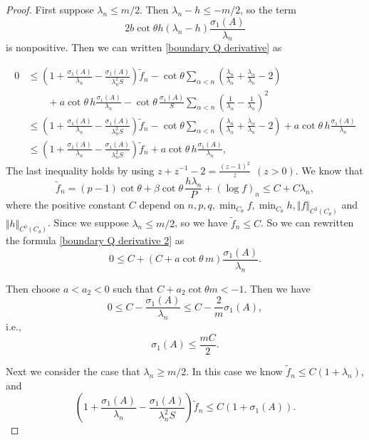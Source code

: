 \documentclass[10pt,a4paper]{amsart}
\begin{document}
\begin{proof}
First suppose $\lambda_n\leq m/2$. Then $\lambda_n-h\leq -m/2$, so the
 term
 $$2b\cot\theta h(\lambda_n -h)\frac{\sigma_1(A)}{\lambda_n}$$
 is nonpositive. Then we can written \eqref{boundary Q derivative} as

 \begin{equation}\label{boundary Q derivative 2}
\begin{split}
        0&\leq \left(1+\frac{\sigma_1(A)}{\lambda_n}
        -\frac{\sigma_1(A)}{\lambda_n^2S}\right)\tilde f_n
        -\cot\theta
        \sum_{\alpha<n}\left(\frac{\lambda_n}{\lambda_{\alpha}}
        +\frac{\lambda_{\alpha}}{\lambda_n}-2\right)\\
        &\qquad
       +a\cot\theta\,h\frac{\sigma_1(A)}{\lambda_n} -\cot\theta\,\frac{\sigma_1(A)}{S}
        \sum_{\alpha<n}\left(\frac1{\lambda_{\alpha}}
        -\frac1{\lambda_n}\right)^2  \\ 
        & 
        \leq \left(1+\frac{\sigma_1(A)}{\lambda_n}
        -\frac{\sigma_1(A)}{\lambda_n^2S}\right)\tilde f_n
        -\cot\theta
        \sum_{\alpha<n}\left(\frac{\lambda_n}{\lambda_{\alpha}}
        +\frac{\lambda_{\alpha}}{\lambda_n}-2\right) +a\cot\theta\,h\frac{\sigma_1(A)}{\lambda_n}\\ 
        &\leq 
        \left(1+\frac{\sigma_1(A)}{\lambda_n}
        -\frac{\sigma_1(A)}{\lambda_n^2S}\right)\tilde f_n +a\cot\theta\,h\frac{\sigma_1(A)}{\lambda_n},
\end{split}
\end{equation}
 The last inequality holds by using $z+z^{-1}-2 = \frac{(z-1)^2}{z} ~~(z>0)$.
We know that 
$$ \tilde f_n
        =(p-1)\cot\theta
        +\beta\cot\theta\,
        \frac{h\lambda_n}{P}
        +(\log f)_n \leq C+C\lambda_n,
        $$
where the positive constant $C$ depend on $n, p, q, \min_{C_{\theta}}f, \min_{C_{\theta}}h, \Vert f\Vert_{C^2 (C_{\theta})}$ and $\Vert h\Vert _{C^0 (C_{\theta})}$. Since we suppose $\lambda_n \leq m/2$, so we have $\tilde{f}_n\leq C$. So we can rewritten the formula \eqref{boundary Q derivative 2} as 
\begin{equation}\label{s4-3}
0\leq C+\left(C+a\cot\theta\,m\right)
        \frac{\sigma_1(A)}{\lambda_n}.
\end{equation}

Then choose $a<a_2<0$ such that $C+a_2 \cot\theta m<-1$. Then we have
$$0\leq C-\frac{\sigma_1(A)}{\lambda_n}\leq C-\frac{2}{m}\sigma_1(A), $$
i.e.,
$$\sigma_1(A)\leq \frac{mC}{2}.$$

Next we consider the case that $\lambda_n\geq m/2$. In this case we know 
$\tilde f_n\leq C(1+\lambda_n)$, and
\[
        \left(1+\frac{\sigma_1(A)}{\lambda_n}
        -\frac{\sigma_1(A)}{\lambda_n^2S}\right)\tilde f_n
        \leq C(1+\sigma_1(A)).
\]


\end{proof}
\end{document}
